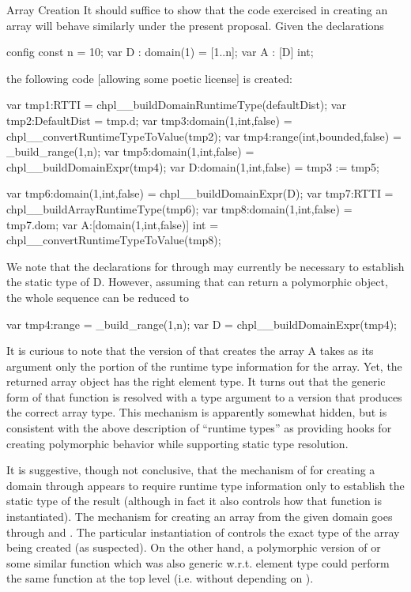 \begin{chapelexample}{Array Creation}
It should suffice to show that the code exercised in creating an array will
behave similarly under the present proposal.  Given the declarations
\begin{chapel}
config const n = 10;
var D : domain(1) = [1..n];
var A : [D] int;
\end{chapel}
\noindent
the following code [allowing some poetic license] is created:
\begin{chapel}
var tmp1:RTTI = chpl__buildDomainRuntimeType(defaultDist);
var tmp2:DefaultDist = tmp.d;
var tmp3:domain(1,int,false) = chpl__convertRuntimeTypeToValue(tmp2);
var tmp4:range(int,bounded,false) = _build_range(1,n);
var tmp5:domain(1,int,false) = chpl__buildDomainExpr(tmp4);
var D:domain(1,int,false) = tmp3 := tmp5;

var tmp6:domain(1,int,false) = chpl__buildDomainExpr(D);
var tmp7:RTTI = chpl__buildArrayRuntimeType(tmp6);
var tmp8:domain(1,int,false) = tmp7.dom;
var A:[domain(1,int,false)] int = chpl__convertRuntimeTypeToValue(tmp8);
\end{chapel}
We note that the declarations for  through  may currently
be necessary to establish the static type of D.  However, assuming that
 can return a polymorphic object, the whole sequence can
be reduced to 
\begin{chapel}
var tmp4:range = _build_range(1,n);
var D = chpl__buildDomainExpr(tmp4);
\end{chapel}

It is curious to note that the version
of  that creates the array A takes as
its argument only the  portion of the runtime type information for
the array.  Yet, the returned array object has the right element type.  It turns
out that the generic form of that function is resolved with a type argument to a
version that produces the correct array type.  This mechanism is apparently
somewhat hidden, but is consistent with the above description of ``runtime
types'' as providing hooks for creating polymorphic behavior while supporting
static type resolution.

It is suggestive, though not conclusive, that the mechanism of
for creating a domain through  appears to require runtime
type information only to establish the static type of the result (although in
fact it also controls how that function is instantiated).  The mechanism for
creating an array from the given domain goes through  and
.  The particular instantiation of
  controls the exact type of the array being
created (as suspected).  On the other hand, a polymorphic version of
 or some similar function which was also generic w.r.t. element type
could perform the same function at the top level (i.e. without depending on
).


\end{chapelexample}
